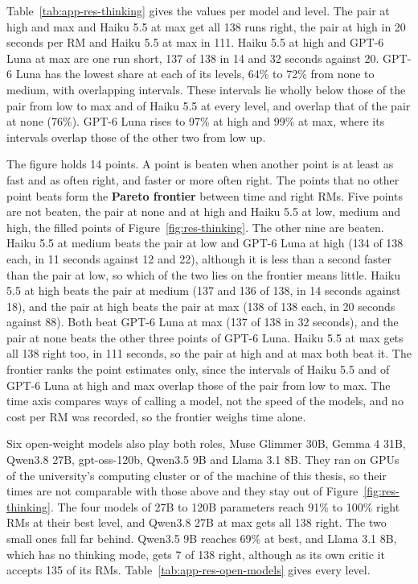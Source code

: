 \documentclass[11pt,english,listoffigures,listoftables]{tfgetsinf}
\begin{document}
Table~\ref{tab:app-res-thinking} gives the values per model and level. The pair at high and max and Haiku 5.5 at max get all 138 runs right, the pair at high in 20 seconds per RM and Haiku 5.5 at max in 111. Haiku 5.5 at high and GPT-6 Luna at max are one run short, 137 of 138 in 14 and 32 seconds against 20. GPT-6 Luna has the lowest share at each of its levels, 64\% to 72\% from none to medium, with overlapping intervals. These intervals lie wholly below those of the pair from low to max and of Haiku 5.5 at every level, and overlap that of the pair at none (76\%). GPT-6 Luna rises to 97\% at high and 99\% at max, where its intervals overlap those of the other two from low up.

The figure holds 14 points. A point is beaten when another point is at least as fast and as often right, and faster or more often right. The points that no other point beats form the \textbf{Pareto frontier} between time and right RMs. Five points are not beaten, the pair at none and at high and Haiku 5.5 at low, medium and high, the filled points of Figure~\ref{fig:res-thinking}. The other nine are beaten. Haiku 5.5 at medium beats the pair at low and GPT-6 Luna at high (134 of 138 each, in 11 seconds against 12 and 22), although it is less than a second faster than the pair at low, so which of the two lies on the frontier means little. Haiku 5.5 at high beats the pair at medium (137 and 136 of 138, in 14 seconds against 18), and the pair at high beats the pair at max (138 of 138 each, in 20 seconds against 88). Both beat GPT-6 Luna at max (137 of 138 in 32 seconds), and the pair at none beats the other three points of GPT-6 Luna. Haiku 5.5 at max gets all 138 right too, in 111 seconds, so the pair at high and at max both beat it. The frontier ranks the point estimates only, since the intervals of Haiku 5.5 and of GPT-6 Luna at high and max overlap those of the pair from low to max. The time axis compares ways of calling a model, not the speed of the models, and no cost per RM was recorded, so the frontier weighs time alone.

Six open-weight models also play both roles, Muse Glimmer 30B, Gemma 4 31B, Qwen3.8 27B, gpt-oss-120b, Qwen3.5 9B and Llama 3.1 8B. They ran on GPUs of the university's computing cluster or of the machine of this thesis, so their times are not comparable with those above and they stay out of Figure~\ref{fig:res-thinking}. The four models of 27B to 120B parameters reach 91\% to 100\% right RMs at their best level, and Qwen3.8 27B at max gets all 138 right. The two small ones fall far behind. Qwen3.5 9B reaches 69\% at best, and Llama 3.1 8B, which has no thinking mode, gets 7 of 138 right, although as its own critic it accepts 135 of its RMs. Table~\ref{tab:app-res-open-models} gives every level.
\end{document}
